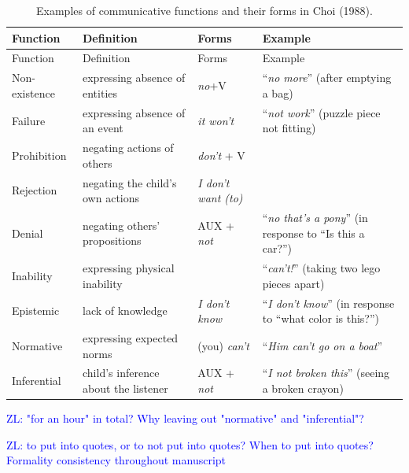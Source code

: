 \documentclass[
  english,
  man,floatsintext]{apa6}
\begin{document}
\begin{longtable}[]{@{}
  >{\raggedright\arraybackslash}p{}
  >{\raggedright\arraybackslash}p{}
  >{\raggedright\arraybackslash}p{}
  >{\raggedright\arraybackslash}p{}@{}}
\caption{\label{tab:choi} Examples of communicative functions and their forms in Choi (1988).}\tabularnewline
\toprule
Function & Definition & Forms & Example \\
\midrule
\endfirsthead
\toprule
Function & Definition & Forms & Example \\
\midrule
\endhead
Non-existence & expressing absence of entities & \emph{no}+V & ``\emph{no more}'' (after emptying a bag) \\
Failure & expressing absence of an event & \emph{it won't} & ``\emph{not work}'' (puzzle piece not fitting) \\
Prohibition & negating actions of others & \emph{don't} + V & \\
Rejection & negating the child's own actions & \emph{I don't want (to)} & \\
Denial & negating others' propositions & AUX + \emph{not} & ``\emph{no that's a pony}'' (in response to ``Is this a car?'') \\
Inability & expressing physical inability & & ``\emph{can't!}'' (taking two lego pieces apart) \\
Epistemic & lack of knowledge & \emph{I don't know} & ``\emph{I don't know}'' (in response to ``what color is this?'') \\
Normative & expressing expected norms & (you) \emph{can't} & ``\emph{Him can't go on a boat}'' \\
Inferential & child's inference about the listener & AUX + \emph{not} & ``\emph{I not broken this}'' (seeing a broken crayon) \\
\bottomrule
\end{longtable}

\textcolor{blue}{ZL: "for an hour" in total? Why leaving out "normative" and "inferential"?}

\textcolor{blue}{ZL: to put into quotes, or to not put into quotes? When to put into quotes? Formality consistency throughout manuscript}
\end{document}
